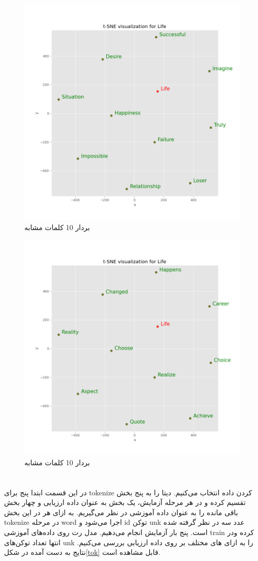 \documentclass[10pt]{article}
\begin{document}
\begin{figure}[H]
	\centering\includegraphics[width=0.6\linewidth]{../reports/word2vec/depression_life_most_similar_word.png}
	\caption{بردار 10 کلمات مشابه 
		}
	\label{most_sim_dep}
\end{figure}

\begin{figure}[H]
	\centering\includegraphics[width=0.6\linewidth]{../reports/word2vec/happiness_life_most_similar_word.png}
	\caption{بردار 10 کلمات مشابه 
		}
	\label{most_sim_hpa}
\end{figure}

\newpage
\section{
}

در این قسمت ابتدا پنج 
برای tokenize کردن داده انتخاب می‌کنیم. دیتا را به پنج بخش تقسیم کرده و در هر مرحله آزمایش، یک بخش به عنوان داده ارزیابی و چهار بخش باقی مانده را به عنوان داده آموزشی در نظر می‌گیریم. به ازای هر
در این بخش tokenize در مرحله word اجرا می‌شود و  id توکن unk عدد سه در نظر گرفته شده است.	 پنج بار آزمایش انجام می‌دهیم. مدل رت روی داده‌های آموزشی train کرده ودر انتها تعداد توکن‌های unk را به ازای
های مختلف بر روی داده ارزیابی بررسی می‌کنیم. نتایج به دست آمده در شکل\ref{tok} قابل مشاهده است. 
\end{document}
